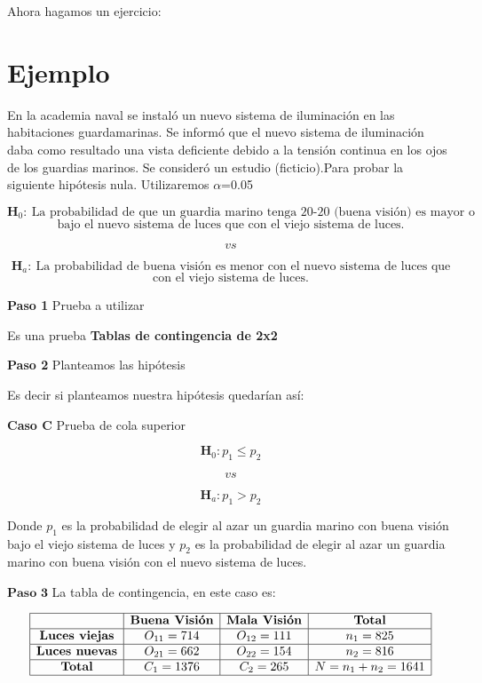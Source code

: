 \documentclass[
  a4paper,
  oneside,
  openany]{book}
\begin{document}
Ahora hagamos un ejercicio:

\hypertarget{ejemplo-10}{%
\section{Ejemplo}\label{ejemplo-10}}

En la academia naval se instaló un nuevo sistema de iluminación en las habitaciones guardamarinas. Se informó que el nuevo sistema de iluminación daba como resultado una vista deficiente debido a la tensión continua en los ojos de los guardias marinos. Se consideró un estudio (ficticio).Para probar la siguiente hipótesis nula. Utilizaremos \(\alpha\)=0.05

\[\textbf{H}_0: \ \mbox{La probabilidad de que un guardia marino tenga 20-20 (buena visión) es mayor o igual}\]
\[\mbox{bajo el nuevo sistema de luces que con el viejo sistema de luces.}\]

\[vs\]

\[\textbf{H}_a: \ \mbox{La probabilidad de buena visión es menor con el nuevo sistema de luces que}\]
\[\mbox{con el viejo sistema de luces.}\]

\textbf{Paso 1} Prueba a utilizar

Es una prueba \textbf{Tablas de contingencia de 2x2}

\textbf{Paso 2} Planteamos las hipótesis

Es decir si planteamos nuestra hipótesis quedarían así:

\textbf{Caso C} Prueba de cola superior

\[\textbf{H}_0: p_{1} \leq p_{2}\]

\[vs\]

\[\textbf{H}_a: p_{1} > p_{2}\]

Donde \(p_{1}\) es la probabilidad de elegir al azar un guardia marino con buena visión bajo el viejo sistema de luces y \(p_{2}\) es la probabilidad de elegir al azar un guardia marino con buena visión con el nuevo sistema de luces.

\(\textbf{Paso 3}\) La tabla de contingencia, en este caso es:

\[
\begin{array}{|c|c|c|c|}
\hline
 & \textbf{Buena Visión} & \textbf{Mala Visión} & \textbf{Total}   \\
\hline
\textbf{Luces viejas} & O_{11}= 714 & O_{12}=111 & n_{1}=825   \\
\hline
\textbf{Luces nuevas} & O_{21}=662 & O_{22}=154 & n_{2}=816\\
\hline
\textbf{Total}  & C_{1}=1376 & C_{2}=265   & N=n_{1}+n_{2}=1641 \\
\hline
\end{array}
\]
\end{document}
